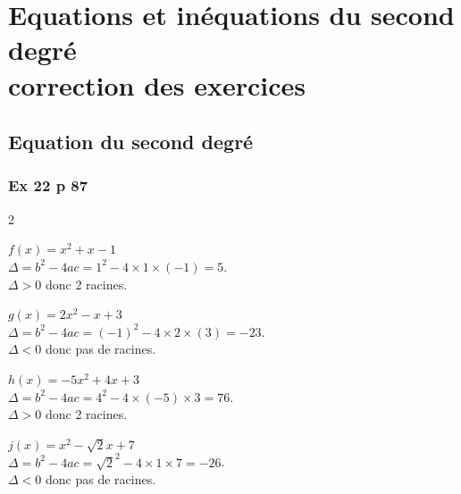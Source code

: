 \documentclass[12pt,a4paper]{book}
\begin{document}
\graphicspath{{images/}}
\setcounter{chapter}{2}
\chapter[Correction des exercices]{Equations et inéquations du second degré \\ correction des exercices}
\thispagestyle{fancy}

\section*{Equation du second degré}



\subsection*{Ex 22 p 87}
\begin{multicols}{2}
\begin{enumMet}
    \item $f(x)=x^2+x-1$\\
    $\Delta=b^2-4ac=1^2-4\times1\times(-1)=5$.\\
    $\Delta>0$ donc 2 racines.
    \item $g(x)=2x^2-x+3$\\
    $\Delta=b^2-4ac=(-1)^2-4\times2\times(3)=-23$.\\
    $\Delta<0$ donc pas de racines.
    \item $h(x)=-5x^2+4x+3$\\
    $\Delta=b^2-4ac=4^2-4\times(-5)\times3=76$.\\
    $\Delta>0$ donc 2 racines.
    \item $j(x)=x^2-\sqrt{2}x+7$\\
    $\Delta=b^2-4ac=\sqrt{2}^2-4\times1\times7=-26$.\\
    $\Delta<0$ donc pas de racines.
\end{enumMet}
\end{multicols}
\end{document}
